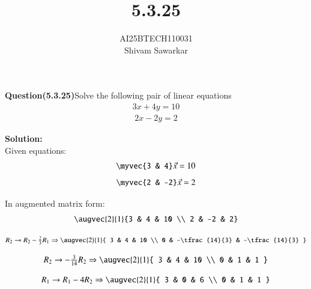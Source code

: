 \documentclass[journal]{IEEEtran}
\begin{document}

\vspace{3cm}

\title{5.3.25}
\author{AI25BTECH110031 \\ Shivam Sawarkar}
 \maketitle
{\let\newpage\relax\maketitle}

\renewcommand{\thefigure}{\theenumi}
\renewcommand{\thetable}{\theenumi}
\setlength{\intextsep}{10pt} %


\renewcommand{\thetable}{\theenumi}

\textbf{Question(5.3.25)}Solve the following pair of linear equations
\begin{align}
3x + 4y = 10
\end{align}
\begin{align}
2x - 2y = 2
\end{align}

\textbf{Solution:} \\ 
Given equations:
\begin{align}
\myvec{3 & 4}\Vec{x}=10
\end{align}
\begin{align}
\myvec{2 & -2}\Vec{x}=2
\end{align}

In augmented matrix form:
\begin{align}
\augvec{2}{1}{3 & 4 & 10 \\ 2 & -2 & 2}
\end{align}

\begin{align}
R_2 \rightarrow R_2 - \tfrac{2}{3}R_1
\Rightarrow
\augvec{2}{1}{
3 & 4 & 10 \\
0 & -\tfrac{14}{3} & -\tfrac{14}{3}
}
\end{align}

\begin{align}
R_2 \rightarrow -\tfrac{3}{14}R_2
\Rightarrow
\augvec{2}{1}{
3 & 4 & 10 \\
0 & 1 & 1
}
\end{align}

\begin{align}
R_1 \rightarrow R_1 - 4R_2
\Rightarrow
\augvec{2}{1}{
3 & 0 & 6 \\
0 & 1 & 1
}
\end{align}
\end{document}
